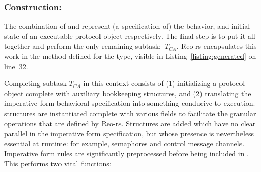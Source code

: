 \subsubsection{Construction: }
The combination of  and  represent (a specification of) the behavior, and initial state of an executable protocol object respectively. The final step is to put it all together and perform the only remaining subtask:~$T_{CA}$. Reo-rs encapsulates this work in the  method defined for the  type, visible in Listing~\ref{listing:generated} on line~32. 

Completing subtask $T_{CA}$ in this context consists of (1) initializing a protocol object complete with auxiliary bookkeeping structures, and (2) translating the imperative form behavioral specification into something conducive to execution.  structures are instantiated complete with various fields to facilitate the granular operations that are defined by Reo-rs. Structures are added which have no clear parallel in the imperative form specification, but whose presence is nevertheless essential at runtime: for example, semaphores and control message channels. Imperative form rules are significantly preprocessed before being included in . This performs two vital functions:

